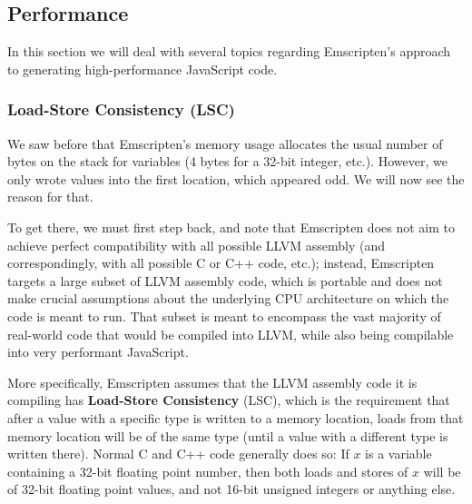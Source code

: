 \documentclass[preprint,10pt]{sigplanconf}
\begin{document}
\subsection{Performance}
\label{sec:perf}

In this section we will deal with several topics regarding
Emscripten's approach to generating high-performance JavaScript code.

\subsubsection{Load-Store Consistency (LSC)}
\label{sec:lsc}

We saw before that Emscripten's memory usage allocates the usual number
of bytes on the stack for variables (4 bytes for a 32-bit integer, etc.).
However, we only wrote values into the first location, which appeared odd.
We will now see the reason for that.

To get there, we must first step back, and note that
Emscripten does not aim to achieve perfect compatibility with all possible
LLVM assembly (and correspondingly, with all possible C or C++ code, etc.);
instead, Emscripten targets a large subset of LLVM assembly code, which is portable
and does not make crucial assumptions about the underlying CPU architecture
on which the code is meant to run. That subset is meant to encompass the
vast majority of real-world code that would be compiled into LLVM,
while also being compilable into very
performant JavaScript.

More specifically, Emscripten assumes that the LLVM assembly code it is
compiling has \textbf{Load-Store Consistency} (LSC), which is the requirement that
after a value with a specific type is written to a memory location, loads from
that memory location will be of the same type (until a value with a different
type is written there).
Normal C and C++
code generally does so: If $x$ is a variable containing a 32-bit floating
point number, then both loads and stores of $x$ will be of 32-bit floating
point values, and not 16-bit unsigned integers or anything else.
\end{document}

